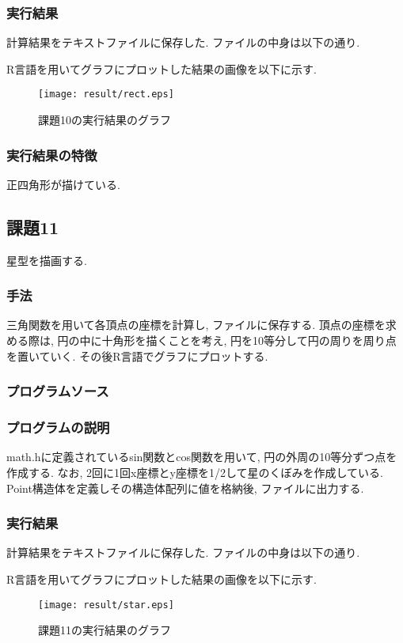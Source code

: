 \documentclass{jsarticle}
\begin{document}
            \subsubsection{実行結果}
                計算結果をテキストファイルに保存した. ファイルの中身は以下の通り. 
                
                R言語を用いてグラフにプロットした結果の画像を以下に示す. 
                \begin{figure}[H]
                    \centering
                    \texttt{[image: result/rect.eps]}
                    \caption{課題10の実行結果のグラフ}
                \end{figure}
            \subsubsection{実行結果の特徴}
                正四角形が描けている. 
        
        \subsection{課題11}
            星型を描画する. 
            \subsubsection{手法}
                三角関数を用いて各頂点の座標を計算し, ファイルに保存する. 
                頂点の座標を求める際は, 円の中に十角形を描くことを考え, 円を10等分して円の周りを周り点を置いていく. 
                その後R言語でグラフにプロットする. 
            \subsubsection{プログラムソース}
                

            \subsubsection{プログラムの説明}
                math.hに定義されているsin関数とcos関数を用いて, 円の外周の10等分ずつ点を作成する. 
                なお, 2回に1回x座標とy座標を1/2して星のくぼみを作成している. 
                Point構造体を定義しその構造体配列に値を格納後, ファイルに出力する. 
            \subsubsection{実行結果}
                計算結果をテキストファイルに保存した. ファイルの中身は以下の通り. 
                
                R言語を用いてグラフにプロットした結果の画像を以下に示す. 
                \begin{figure}[H]
                    \centering
                    \texttt{[image: result/star.eps]}
                    \caption{課題11の実行結果のグラフ}
                \end{figure}
\end{document}
